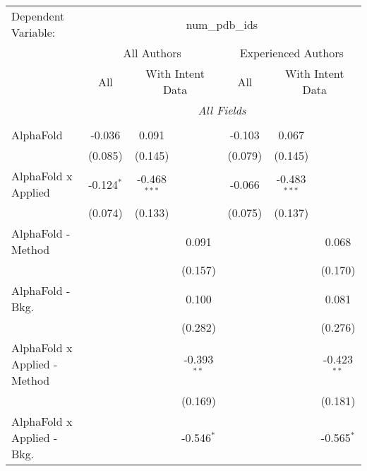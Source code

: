 \begingroup
\centering
\begin{tabular}{lcccccc}
   \tabularnewline \midrule \midrule
   Dependent Variable: & \multicolumn{6}{c}{num\_pdb\_ids}\\
 & \multicolumn{3}{c}{All Authors} & \multicolumn{3}{c}{Experienced Authors} \\
\cmidrule(lr){2-4} \cmidrule(lr){5-7}
 & \multicolumn{1}{c}{All} & \multicolumn{2}{c}{With Intent Data} & \multicolumn{1}{c}{All} & \multicolumn{2}{c}{With Intent Data} \\
\cmidrule(lr){2-2} \cmidrule(lr){3-4} \cmidrule(lr){5-5} \cmidrule(lr){6-7}
 & \multicolumn{6}{c}{\textit{All Fields}} \\ \\
   AlphaFold                      & -0.036         & 0.091          &               & -0.103         & 0.067          &   \\   
                                  & (0.085)        & (0.145)        &               & (0.079)        & (0.145)        &   \\   
   AlphaFold x Applied            & -0.124$^{*}$   & -0.468$^{***}$ &               & -0.066         & -0.483$^{***}$ &   \\   
                                  & (0.074)        & (0.133)        &               & (0.075)        & (0.137)        &   \\   
   AlphaFold - Method             &                &                & 0.091         &                &                & 0.068\\   
                                  &                &                & (0.157)       &                &                & (0.170)\\   
   AlphaFold - Bkg.               &                &                & 0.100         &                &                & 0.081\\   
                                  &                &                & (0.282)       &                &                & (0.276)\\   
   AlphaFold x Applied - Method   &                &                & -0.393$^{**}$ &                &                & -0.423$^{**}$\\   
                                  &                &                & (0.169)       &                &                & (0.181)\\   
   AlphaFold x Applied - Bkg.     &                &                & -0.546$^{*}$  &                &                & -0.565$^{*}$\\   

\end{tabular}
